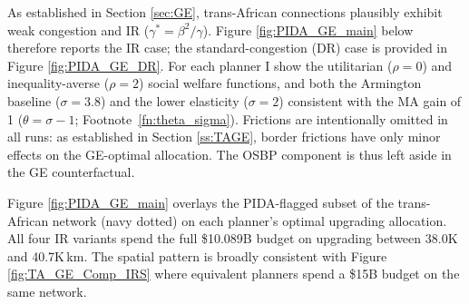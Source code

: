 \documentclass[a4paper]{article}
\begin{document}
As established in Section \ref{sec:GE}, trans-African connections plausibly exhibit weak congestion and IR ($\gamma^\ast = \beta^2/\gamma$). Figure \ref{fig:PIDA_GE_main} below therefore reports the IR case; the standard-congestion (DR) case is provided in Figure \ref{fig:PIDA_GE_DR}. For each planner I show the utilitarian ($\rho = 0$) and inequality-averse ($\rho = 2$) social welfare functions, and both the Armington baseline ($\sigma = 3.8$) and the lower elasticity ($\sigma = 2$) consistent with the MA gain of 1 ($\theta = \sigma - 1$; Footnote~\ref{fn:theta_sigma}). Frictions are intentionally omitted in all runs: as established in Section \ref{ss:TAGE}, border frictions have only minor effects on the GE-optimal allocation. The OSBP component is thus left aside in the GE counterfactual. \newline

Figure \ref{fig:PIDA_GE_main} overlays the PIDA-flagged subset of the trans-African network (navy dotted) on each planner's optimal upgrading allocation. All four IR variants spend the full \$10.089B budget on upgrading between 38.0K and 40.7K\,km. The spatial pattern is broadly consistent with Figure \ref{fig:TA_GE_Comp_IRS} where equivalent planners spend a \$15B budget on the same network. \newline %
\end{document}
